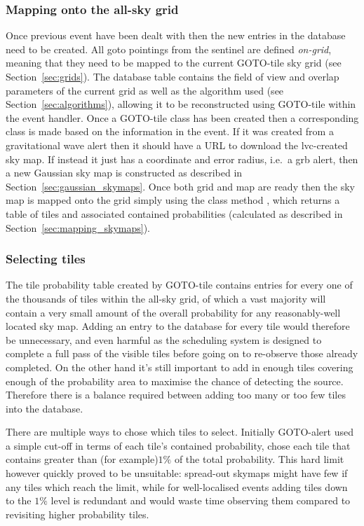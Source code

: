 \begin{colsection}
\begin{colsection}
\subsubsection{Mapping onto the all-sky grid}

Once previous event have been dealt with then the new entries in the database need to be created. All \gls{goto} pointings from the sentinel are defined \textit{on-grid}, meaning that they need to be mapped to the current GOTO-tile sky grid (see Section~\ref{sec:grids}). The database  table contains the field of view and overlap parameters of the current grid as well as the algorithm used (see Section~\ref{sec:algorithms}), allowing it to be reconstructed using GOTO-tile within the event handler. Once a GOTO-tile  class has been created then a corresponding  class is made based on the information in the event. If it was created from a gravitational wave alert then it should have a URL to download the \gls{lvc}-created sky map. If instead it just has a coordinate and error radius, i.e.\ a \gls{grb} alert, then a new Gaussian sky map is constructed as described in Section~\ref{sec:gaussian_skymaps}. Once both grid and map are ready then the sky map is mapped onto the grid simply using the class method , which returns a table of tiles and associated contained probabilities (calculated as described in Section~\ref{sec:mapping_skymaps}). %

\subsubsection{Selecting tiles}

The tile probability table created by GOTO-tile contains entries for every one of the thousands of tiles within the all-sky grid, of which a vast majority will contain a very small amount of the overall probability for any reasonably-well located sky map. Adding an entry to the database for every tile would therefore be unnecessary, and even harmful as the scheduling system is designed to complete a full pass of the visible tiles before going on to re-observe those already completed. On the other hand it's still important to add in enough tiles covering enough of the probability area to maximise the chance of detecting the source. Therefore there is a balance required between adding too many or too few tiles into the database.

There are multiple ways to chose which tiles to select. Initially GOTO-alert used a simple cut-off in terms of each tile's contained probability, chose each tile that contains greater than (for example)$1\%$ of the total probability. This hard limit however quickly proved to be unsuitable: spread-out skymaps might have few if any tiles which reach the limit, while for well-localised events adding tiles down to the $1\%$ level is redundant and would waste time observing them compared to revisiting higher probability tiles.


\end{colsection}
\end{colsection}
